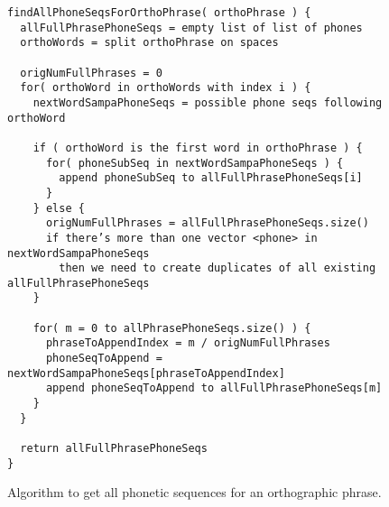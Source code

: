 
\setlength\LTleft{-2in}
\begin{figure}
\begin{verbatim}
findAllPhoneSeqsForOrthoPhrase( orthoPhrase ) {
  allFullPhrasePhoneSeqs = empty list of list of phones
  orthoWords = split orthoPhrase on spaces
  
  origNumFullPhrases = 0
  for( orthoWord in orthoWords with index i ) {
    nextWordSampaPhoneSeqs = possible phone seqs following orthoWord
    
    if ( orthoWord is the first word in orthoPhrase ) {
      for( phoneSubSeq in nextWordSampaPhoneSeqs ) {
        append phoneSubSeq to allFullPhrasePhoneSeqs[i]
      }
    } else {
      origNumFullPhrases = allFullPhrasePhoneSeqs.size()
      if there’s more than one vector <phone> in nextWordSampaPhoneSeqs
        then we need to create duplicates of all existing allFullPhrasePhoneSeqs
    }
    
    for( m = 0 to allPhrasePhoneSeqs.size() ) {
      phraseToAppendIndex = m / origNumFullPhrases
      phoneSeqToAppend = nextWordSampaPhoneSeqs[phraseToAppendIndex]
      append phoneSeqToAppend to allFullPhrasePhoneSeqs[m]
    }
  }

  return allFullPhrasePhoneSeqs
}
\end{verbatim}
\captionfonts
\caption[Pseudocode for findAllPhoneSeqsForOrthoPhrase]{ Algorithm to get all phonetic sequences for an orthographic phrase. }
\label{fig:psuedoCode:findAllPhoneSeqsForOrthoPhrase}
\end{figure}

